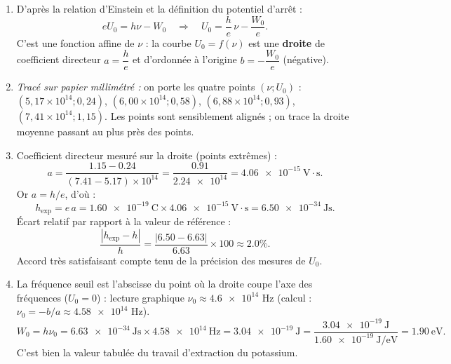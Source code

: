 \documentclass[11pt]{article}
\begin{document}
\begin{corrige}
\begin{enumerate}
\item D'après la relation d'Einstein et la définition du potentiel d'arrêt :
\[ eU_0 = h\nu - W_0 \quad\Rightarrow\quad U_0 = \frac{h}{e}\,\nu - \frac{W_0}{e}. \]
C'est une fonction affine de $\nu$ : la courbe $U_0 = f(\nu)$ est une \textbf{droite} de coefficient directeur $a = \dfrac{h}{e}$ et d'ordonnée à l'origine $b = -\dfrac{W_0}{e}$ (négative).
\item \textit{Tracé sur papier millimétré :} on porte les quatre points $(\nu ; U_0)$ : $(5,17\times10^{14} ; 0,24)$, $(6,00\times10^{14} ; 0,58)$, $(6,88\times10^{14} ; 0,93)$, $(7,41\times10^{14} ; 1,15)$. Les points sont sensiblement alignés ; on trace la droite moyenne passant au plus près des points.
\item Coefficient directeur mesuré sur la droite (points extrêmes) :
\[ a = \frac{\num{1,15} - \num{0,24}}{(\num{7,41} - \num{5,17})\times 10^{14}} = \frac{\num{0,91}}{\num{2,24e14}} = \num{4,06e-15}~\text{V}\cdot\text{s}. \]
Or $a = h/e$, d'où :
\[ h_{\text{exp}} = e\,a = \SI{1,60e-19}{\coulomb}\times\num{4,06e-15}~\text{V}\cdot\text{s} = \SI{6,50e-34}{\joule\second}. \]
Écart relatif par rapport à la valeur de référence :
\[ \frac{|h_{\text{exp}} - h|}{h} = \frac{|\num{6,50} - \num{6,63}|}{\num{6,63}} \times 100 \approx \num{2,0}\%. \]
Accord très satisfaisant compte tenu de la précision des mesures de $U_0$.
\item La fréquence seuil est l'abscisse du point où la droite coupe l'axe des fréquences ($U_0 = 0$) : lecture graphique $\nu_0 \approx \num{4,6e14}$ Hz (calcul : $\nu_0 = -b/a \approx \num{4,58e14}$ Hz).
\[ W_0 = h\nu_0 = \SI{6,63e-34}{\joule\second}\times\num{4,58e14}~\text{Hz} = \SI{3,04e-19}{\joule} = \frac{\SI{3,04e-19}{\joule}}{\SI{1,60e-19}{\joule\per\electronvolt}} = \SI{1,90}{\electronvolt}. \]
C'est bien la valeur tabulée du travail d'extraction du potassium.
\end{enumerate}
\end{corrige}
\end{document}
